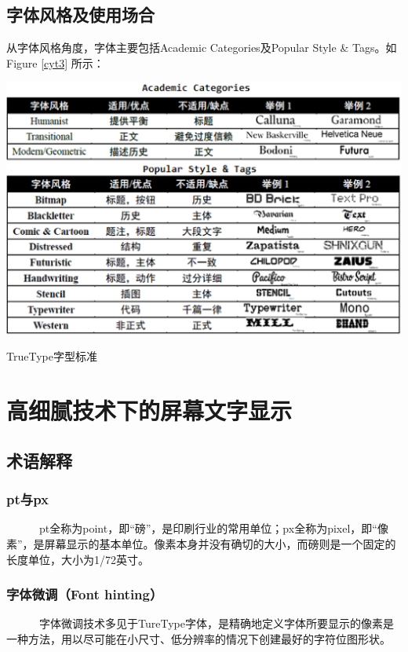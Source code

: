 \documentclass[a4paper]{article}
\begin{document}
\subsection{字体风格及使用场合}
从字体风格角度，字体主要包括Academic Categories及Popular Style \& Tags。如Figure \ref{cyt3}
所示：

\makeatletter
\def\@captype{figure}
\makeatother
\centerline{\includegraphics [width=1.2\textwidth]{cyt3.png} }
\caption{TrueType字型标准}
\label{cyt3}


\section{高细腻技术下的屏幕文字显示}
\subsection{术语解释}
\subsubsection{pt与px}

~~~~~~pt全称为point，即“磅”，是印刷行业的常用单位；px全称为pixel，即“像素”，是屏幕显示的基本单位。像素本身并没有确切的大小，而磅则是一个固定的长度单位，大小为1/72英寸。

\subsubsection{字体微调（Font hinting）}
~~~~~~字体微调技术多见于TureType字体\cite{mxw1}，是精确地定义字体所要显示的像素是一种方法，用以尽可能在小尺寸、低分辨率的情况下创建最好的字符位图形状。
\end{document}
